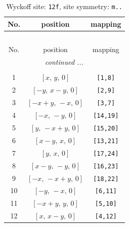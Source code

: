 \documentclass[fleqn,8pt]{jsarticle}
\begin{document}
\begin{longtable}{ccc}
\caption{Wyckoff site: {\tt 12f}, site symmetry: {\tt m..}}
 \\
 \hline \hline
No. & position & mapping \\ \hline \endfirsthead

\multicolumn{2}{l}{\tablename\ \thetable{}} \\
 \hline \hline
No. & position & mapping \\ \hline \endhead

 \hline \hline
\multicolumn{2}{r}{\footnotesize\it continued ...} \\ \endfoot

 \hline \hline
\multicolumn{2}{r}{} \\ \endlastfoot

1 & $\left[ x,\, y,\, 0 \right]$ & {\tt [1,8]} \\ \hline
2 & $\left[ - y,\, x - y,\, 0 \right]$ & {\tt [2,9]} \\ \hline
3 & $\left[ - x + y,\, - x,\, 0 \right]$ & {\tt [3,7]} \\ \hline
4 & $\left[ - x,\, - y,\, 0 \right]$ & {\tt [14,19]} \\ \hline
5 & $\left[ y,\, - x + y,\, 0 \right]$ & {\tt [15,20]} \\ \hline
6 & $\left[ x - y,\, x,\, 0 \right]$ & {\tt [13,21]} \\ \hline
7 & $\left[ y,\, x,\, 0 \right]$ & {\tt [17,24]} \\ \hline
8 & $\left[ x - y,\, - y,\, 0 \right]$ & {\tt [16,23]} \\ \hline
9 & $\left[ - x,\, - x + y,\, 0 \right]$ & {\tt [18,22]} \\ \hline
10 & $\left[ - y,\, - x,\, 0 \right]$ & {\tt [6,11]} \\ \hline
11 & $\left[ - x + y,\, y,\, 0 \right]$ & {\tt [5,10]} \\ \hline
12 & $\left[ x,\, x - y,\, 0 \right]$ & {\tt [4,12]} \\
\end{longtable}
\renewcommand{\arraystretch}{1.2}
\end{document}
